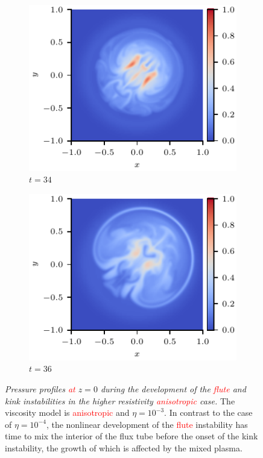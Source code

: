 \documentclass[12pt]{article}
\newcommand{\rs}[2]{\textcolor{red}{#2}}
\newcommand{\mycaption}[2]{\caption[#1]{\emph{#1} #2}}
\begin{document}
\begin{figure}[t]
\begin{subfigure}{0.32\textwidth}
      \includegraphics[width=\linewidth]{swi-3_pressure_17.pdf}
      \caption{$t=34$}
      \label{fig:swi-3_pressure_17}
    \end{subfigure}
    \hfill
    \begin{subfigure}{0.32\textwidth}
      \includegraphics[width=\linewidth]{swi-3_pressure_18.pdf}
      \caption{$t=36$}
      \label{fig:swi-3_pressure_18}
    \end{subfigure}
\mycaption{Pressure profiles \rs{through}{at} $z=0$ during the development of the \rs{fluting}{flute} and kink instabilities in the higher resistivity \rs{switching}{anisotropic} case.}{The viscosity model is \rs{switching}{anisotropic} and $\eta = 10^{-3}$. In contrast to the case of $\eta=10^{-4}$, the nonlinear development of the \rs{fluting}{flute} instability has time to mix the interior of the flux tube before the onset of the kink instability, the growth of which is affected by the mixed plasma.}
\label{fig:kink_pressure_slices-3}%
\end{figure}
\end{document}
